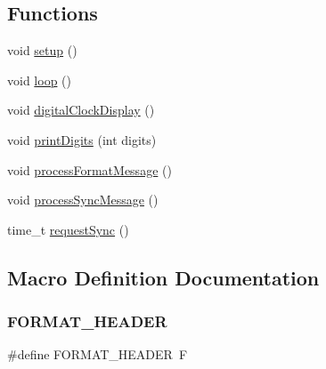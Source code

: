 \subsection*{Functions}
\begin{DoxyCompactItemize}
\item 
void \hyperlink{_time_serial_date_strings_8ino_a4fc01d736fe50cf5b977f755b675f11d}{setup} ()
\item 
void \hyperlink{_time_serial_date_strings_8ino_afe461d27b9c48d5921c00d521181f12f}{loop} ()
\item 
void \hyperlink{_time_serial_date_strings_8ino_a01f3a72442d58926459c48afce4746e7}{digital\+Clock\+Display} ()
\item 
void \hyperlink{_time_serial_date_strings_8ino_a772afab0396032477ec7b01d14c774b2}{print\+Digits} (int digits)
\item 
void \hyperlink{_time_serial_date_strings_8ino_a72bf283777cd5baa3fe800a9a6c22d77}{process\+Format\+Message} ()
\item 
void \hyperlink{_time_serial_date_strings_8ino_a49f4bff50a6119cf44f9793a02ad634c}{process\+Sync\+Message} ()
\item 
time\+\_\+t \hyperlink{_time_serial_date_strings_8ino_a0ec9458a3ed4ddac072047471be25b1b}{request\+Sync} ()
\end{DoxyCompactItemize}


\subsection{Macro Definition Documentation}
\mbox{\label{_time_serial_date_strings_8ino_a0d13e168e30875fc39d1da1966c5ddc8}} 
\subsubsection{\texorpdfstring{F\+O\+R\+M\+A\+T\+\_\+\+H\+E\+A\+D\+ER}{FORMAT\_HEADER}}
{\footnotesize\ttfamily \#define F\+O\+R\+M\+A\+T\+\_\+\+H\+E\+A\+D\+ER~\textquotesingle{}F\textquotesingle{}}

\mbox{\label{_time_serial_date_strings_8ino_acf04ec5bf2d3f42a055c143fd7d3e031}} 
